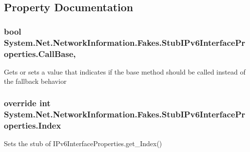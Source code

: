 \subsection{Property Documentation}
\hypertarget{class_system_1_1_net_1_1_network_information_1_1_fakes_1_1_stub_i_pv6_interface_properties_a4cad5236d0ed7beeef0dd88210829e15}{
\subsubsection[{Call\-Base}]{\setlength{\rightskip}{0pt plus 5cm}bool System.\-Net.\-Network\-Information.\-Fakes.\-Stub\-I\-Pv6\-Interface\-Properties.\-Call\-Base\hspace{0.3cm}{\ttfamily [get]}, {\ttfamily [set]}}}\label{class_system_1_1_net_1_1_network_information_1_1_fakes_1_1_stub_i_pv6_interface_properties_a4cad5236d0ed7beeef0dd88210829e15}


Gets or sets a value that indicates if the base method should be called instead of the fallback behavior

\hypertarget{class_system_1_1_net_1_1_network_information_1_1_fakes_1_1_stub_i_pv6_interface_properties_aa7bea263d105d3ef6a349b6bcaf1d9f5}{
\subsubsection[{Index}]{\setlength{\rightskip}{0pt plus 5cm}override int System.\-Net.\-Network\-Information.\-Fakes.\-Stub\-I\-Pv6\-Interface\-Properties.\-Index\hspace{0.3cm}{\ttfamily [get]}}}\label{class_system_1_1_net_1_1_network_information_1_1_fakes_1_1_stub_i_pv6_interface_properties_aa7bea263d105d3ef6a349b6bcaf1d9f5}


Sets the stub of I\-Pv6\-Interface\-Properties.\-get\-\_\-\-Index()

